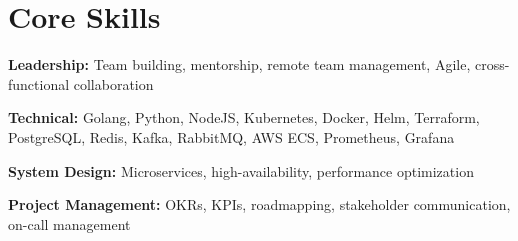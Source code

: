 \section{Core Skills}

    \begin{onecolentry}
        \textbf{Leadership:} Team building, mentorship, remote team management, Agile, cross-functional collaboration
    \end{onecolentry}
    \begin{onecolentry}
        \textbf{Technical:} Golang, Python, NodeJS, Kubernetes, Docker, Helm, Terraform, PostgreSQL, Redis, Kafka, RabbitMQ, AWS ECS, Prometheus, Grafana
    \end{onecolentry}
    \begin{onecolentry}
        \textbf{System Design:} Microservices, high-availability, performance optimization
    \end{onecolentry}
    \begin{onecolentry}
        \textbf{Project Management:} OKRs, KPIs, roadmapping, stakeholder communication, on-call management
    \end{onecolentry}

